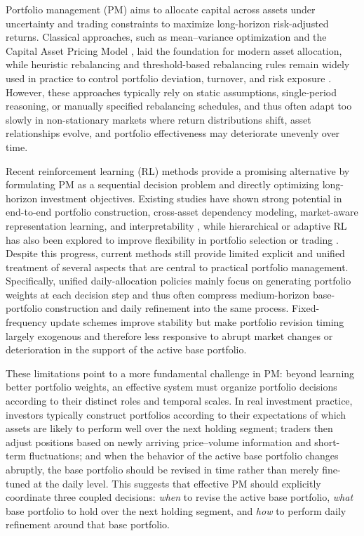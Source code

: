 \documentclass[letterpaper]{article} %
\begin{document}
Portfolio management (PM) aims to allocate capital across assets under uncertainty and trading constraints to maximize long-horizon risk-adjusted returns. Classical approaches, such as mean--variance optimization \citep{MVO} and the Capital Asset Pricing Model \citep{CAMP}, laid the foundation for modern asset allocation, while heuristic rebalancing and threshold-based rebalancing rules remain widely used in practice to control portfolio deviation, turnover, and risk exposure \citep{Perold1988DynamicSF,9}. However, these approaches typically rely on static assumptions, single-period reasoning, or manually specified rebalancing schedules, and thus often adapt too slowly in non-stationary markets where return distributions shift, asset relationships evolve, and portfolio effectiveness may deteriorate unevenly over time.

Recent reinforcement learning (RL) methods provide a promising alternative by formulating PM as a sequential decision problem and directly optimizing long-horizon investment objectives. Existing studies have shown strong potential in end-to-end portfolio construction, cross-asset dependency modeling, market-aware representation learning, and interpretability \citep{4,5,6,8,alphastock}, while hierarchical or adaptive RL has also been explored to improve flexibility in portfolio selection or trading \citep{25}. Despite this progress, current methods still provide limited explicit and unified treatment of several aspects that are central to practical portfolio management. Specifically, unified daily-allocation policies mainly focus on generating portfolio weights at each decision step and thus often compress medium-horizon base-portfolio construction and daily refinement into the same process. Fixed-frequency update schemes improve stability but make portfolio revision timing largely exogenous and therefore less responsive to abrupt market changes or deterioration in the support of the active base portfolio.

These limitations point to a more fundamental challenge in PM: beyond learning better portfolio weights, an effective system must organize portfolio decisions according to their distinct roles and temporal scales. In real investment practice, investors typically construct portfolios according to their expectations of which assets are likely to perform well over the next holding segment; traders then adjust positions based on newly arriving price--volume information and short-term fluctuations; and when the behavior of the active base portfolio changes abruptly, the base portfolio should be revised in time rather than merely fine-tuned at the daily level. This suggests that effective PM should explicitly coordinate three coupled decisions: \emph{when} to revise the active base portfolio, \emph{what} base portfolio to hold over the next holding segment, and \emph{how} to perform daily refinement around that base portfolio.
\end{document}
